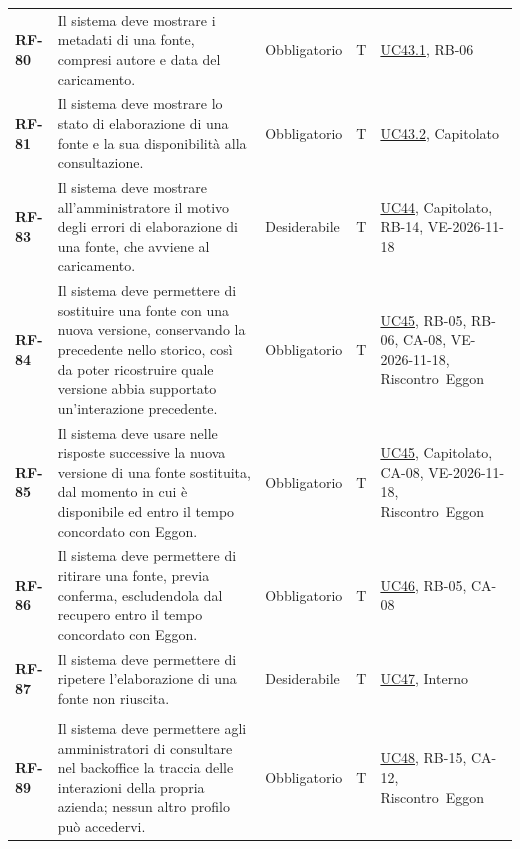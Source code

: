 \documentclass[documento]{gpt}
\begin{document}
{\begin{longtable}{@{}>{\raggedright\arraybackslash}p{1.35cm}>{\raggedright\arraybackslash}p{7.3cm}>{\raggedright\arraybackslash}p{1.9cm}>{\centering\arraybackslash}p{0.75cm}>{\raggedright\arraybackslash}p{3.1cm}@{}}
\leavevmode\hypertarget{req:RF-80}{\textbf{RF-80}} & Il sistema deve mostrare i metadati di una fonte, compresi autore e data del caricamento. & Obbligatorio & T & \hyperref[uc:fn_meta_v]{UC43.1}, \mbox{RB-06} \\
\leavevmode\hypertarget{req:RF-81}{\textbf{RF-81}} & Il sistema deve mostrare lo stato di elaborazione di una fonte e la sua disponibilità alla consultazione. & Obbligatorio & T & \hyperref[uc:fn_stato]{UC43.2}, \mbox{Capitolato} \\
\leavevmode\hypertarget{req:RF-83}{\textbf{RF-83}} & Il sistema deve mostrare all’amministratore il motivo degli errori di elaborazione di una fonte, che avviene al caricamento. & Desiderabile & T & \hyperref[uc:fn_errore]{UC44}, \mbox{Capitolato}, \mbox{RB-14}, \mbox{VE-2026-11-18} \\
\leavevmode\hypertarget{req:RF-84}{\textbf{RF-84}} & Il sistema deve permettere di sostituire una fonte con una nuova versione, conservando la precedente nello storico, così da poter ricostruire quale versione abbia supportato un’interazione precedente. & Obbligatorio & T & \hyperref[uc:fn_sostituisci]{UC45}, \mbox{RB-05}, \mbox{RB-06}, \mbox{CA-08}, \mbox{VE-2026-11-18}, \mbox{Riscontro Eggon} \\
\leavevmode\hypertarget{req:RF-85}{\textbf{RF-85}} & Il sistema deve usare nelle risposte successive la nuova versione di una fonte sostituita, dal momento in cui è disponibile ed entro il tempo concordato con Eggon. & Obbligatorio & T & \hyperref[uc:fn_sostituisci]{UC45}, \mbox{Capitolato}, \mbox{CA-08}, \mbox{VE-2026-11-18}, \mbox{Riscontro Eggon} \\
\leavevmode\hypertarget{req:RF-86}{\textbf{RF-86}} & Il sistema deve permettere di ritirare una fonte, previa conferma, escludendola dal recupero entro il tempo concordato con Eggon. & Obbligatorio & T & \hyperref[uc:fn_ritira]{UC46}, \mbox{RB-05}, \mbox{CA-08} \\
\leavevmode\hypertarget{req:RF-87}{\textbf{RF-87}} & Il sistema deve permettere di ripetere l’elaborazione di una fonte non riuscita. & Desiderabile & T & \hyperref[uc:fn_riprova]{UC47}, \mbox{Interno} \\
\addlinespace[3pt]\multicolumn{5}{@{}l}{\textbf{\sffamily Tracciabilità}} \\ \addlinespace[2pt]
\leavevmode\hypertarget{req:RF-89}{\textbf{RF-89}} & Il sistema deve permettere agli amministratori di consultare nel backoffice la traccia delle interazioni della propria azienda; nessun altro profilo può accedervi. & Obbligatorio & T & \hyperref[uc:tr_elenco]{UC48}, \mbox{RB-15}, \mbox{CA-12}, \mbox{Riscontro Eggon} \\

\end{longtable}}
\end{document}
